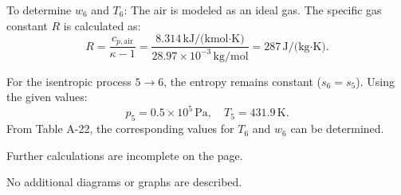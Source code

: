 To determine \( w_6 \) and \( T_6 \):  
The air is modeled as an ideal gas. The specific gas constant \( R \) is calculated as:  
\[
R = \frac{c_{p,\text{air}}}{\kappa - 1} = \frac{8.314 \, \text{kJ/(kmol·K)}}{28.97 \times 10^{-3} \, \text{kg/mol}} = 287 \, \text{J/(kg·K)}.
\]  

For the isentropic process \( 5 \to 6 \), the entropy remains constant (\( s_6 = s_5 \)). Using the given values:  
\[
p_5 = 0.5 \times 10^5 \, \text{Pa}, \quad T_5 = 431.9 \, \text{K}.
\]  
From Table A-22, the corresponding values for \( T_6 \) and \( w_6 \) can be determined.  

Further calculations are incomplete on the page.  

No additional diagrams or graphs are described.
